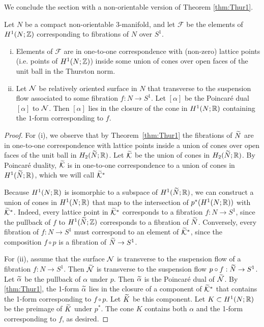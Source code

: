 We conclude the section with a non-orientable version of Theorem \ref{thm:Thur1}.
\begin{thm}
  \label{thm:classifying-fibrations}
  Let $N$ be a compact non-orientable $3$-manifold, and let $\mathcal{F}$ be the elements of $H^1(N; \mathbb{Z})$ corresponding to fibrations of $N$ over $S^1$.
  \begin{enumerate}[(i)]
  \item Elements of $\mathcal{F}$ are in one-to-one correspondence with (non-zero) lattice points (i.e. points of $H^1(N; \mathbb{Z})$) inside some union of cones over open faces of the unit ball in the Thurston norm.
  \item Let $\mathcal{N}$ be relatively oriented surface in $N$ that transverse to the suspension flow associated to some fibration $f: N \to S^1$.  Let $[\alpha]$ be the Poincar\'e dual $[\alpha]$ to $\mathcal{N}$.  Then $[\alpha]$ lies in the closure of the cone in $H^1(N; \mathbb{R})$ containing the $1$-form corresponding to $f$.
  \end{enumerate}
\end{thm}
\begin{proof}
For (i), we observe that by Theorem~\ref{thm:Thur1} the fibrations of $\widetilde{N}$ are in one-to-one correspondence with lattice points inside a union of cones over open faces of the unit ball in $H_2(\widetilde{N};\mathbb{R})$.  Let $\widetilde{\mathcal{K}}$ be the union of cones in $H_2(\widetilde{N};\mathbb{R})$.
 By Poincar\'e duality, $\widetilde{\mathcal{K}}$ is in one-to-one correspondence to a union of cones in $H^1(\widetilde{N};\mathbb{R})$, which we will call $\widetilde{\mathcal{K}}^\ast$

  Because $H^1(N;\mathbb{R})$ is isomorphic to a subspace of $H^1(\widetilde{N};\mathbb{R})$, we can construct a union of cones in $H^1(N; \mathbb{R})$ that map to the intersection of $p^\ast(H^1(N; \mathbb{R}))$ with $\widetilde{\mathcal{K}}^\ast$.
  Indeed, every lattice point in $\widetilde{\mathcal{K}}^\ast$ corresponds to a fibration $f:N\to S^1$, since the pullback of $f$ to $H^1(\widetilde{N}; \mathbb{Z})$ corresponds to a fibration of $\widetilde{N}$.
  Conversely, every fibration of $f:N\rightarrow S^1$ must correspond to an element of $\widetilde{\mathcal{K}}^\ast$, since the composition $f\circ p$ is a fibration of $\widetilde{N}\rightarrow S^1$.

  For (ii), assume that the surface $\mathcal{N}$ is transverse to the suspension flow of a fibration $f:N\rightarrow S^1$. Then $\widetilde{\mathcal{N}}$ is transverse to the suspension flow $p \circ f:\widetilde{N}\rightarrow S^1$.  Let $\widetilde{\alpha}$ be the pullback of $\alpha$ under $p$.  Then $\widetilde{\alpha}$ is the Poincar\'e dual of $\widetilde{\mathcal{N}}$.  By \autoref{thm:Thur1}, the 1-form $\widetilde{\alpha}$ lies in the closure of a component of $\widetilde{\mathcal{K}}^\ast$ that contains the 1-form corresponding to $f\circ p$.  Let $\widetilde{K}$ be this component.  Let $K\subset H^1(N;\mathbb{R})$ be the preimage of $\widetilde{K}$ under $p^\ast$.  The cone $K$ contains both $\alpha$ and the 1-form corresponding to $f$, as desired.
\end{proof}

